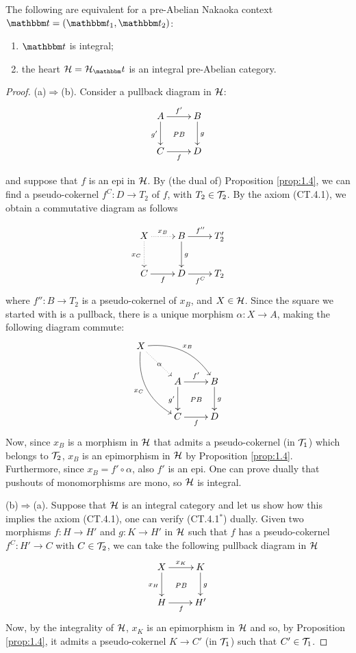 \begin{thm}\label{5:thm:integral}
The following are equivalent for a pre-Abelian Nakaoka context $\t=(\t_1,\t_2)$:
\begin{enumerate}[label=(\alph*)]
\item $\t$ is integral;
\item the heart $\clH=\clH_\t$ is an integral pre-Abelian category.
\end{enumerate}
\end{thm}
\begin{proof}
(a)$\Rightarrow$(b). Consider a pullback diagram in $\mathcal{H}$:
\[
\xymatrix{
A\ar@{}[dr]|{PB}\ar[r]^{f'}\ar[d]_{g'}&B\ar[d]^g\\
C\ar[r]_{f}&D
}
\]
\begin{sloppypar}
and suppose that $f$ is an epi in $\mathcal{H}$. By (the dual of) Proposition \ref{prop:1.4}, we can find a pseudo-cokernel $f^C\colon D\to T_2$ of $f$, with ${T_2\in \mathcal{T}_2}$. By the axiom (CT.4.1), we obtain a commutative diagram as follows
\end{sloppypar}
\[
\xymatrix{
X\ar@{.>}[d]_{x_C}\ar@{.>}[r]^{x_B}&B\ar[r]^{f''}\ar[d]^{g}&T'_2\\
C\ar[r]_f&D\ar[r]_{f^C}&T_2
}
\]
where $f''\colon B\to T_2$ is a pseudo-cokernel of $x_B$, and $X\in \mathcal{H}$. Since the square we started with is a pullback, there is a unique morphism $\alpha\colon X\to A$, making the following diagram commute:
\[
\xymatrix{
X\ar@/_15pt/[ddr]_{x_C}\ar@/_-15pt/[rrd]^{x_B}\ar@{.>}[dr]|\alpha\\
&A\ar@{}[dr]|{PB}\ar[r]^{f'}\ar[d]_{g'}&B\ar[d]^g\\
&C\ar[r]_{f}&D
}
\]
Now, since $x_B$ is a morphism in $\mathcal{H}$ that admits a pseudo-cokernel (in $\mathcal{T}_1$) which belongs to $\mathcal{T}_2$, $x_B$ is an epimorphism in $\mathcal{H}$ by Proposition \ref{prop:1.4}. Furthermore, since $x_B=f'\circ\alpha$, also $f'$ is an epi. One can prove dually that pushouts of monomorphisms are mono, so $\mathcal{H}$ is integral.

\smallskip\noindent
(b)$\Rightarrow$(a). Suppose that $\mathcal{H}$ is an integral category and let us show how this implies the axiom (CT.4.1), one can verify (CT.4.1$^*$) dually. Given two morphisms $f\colon H\to H'$ and $g\colon K\to H'$ in $\mathcal{H}$ such that $f$ has a pseudo-cokernel $f^C\colon H'\to C$ with $C\in \mathcal{T}_2$, we can take the following pullback diagram in $\mathcal{H}$
\[
\xymatrix{
X\ar[d]_{x_H}\ar[r]^{x_K}\ar@{}[dr]|{PB}&K\ar[d]^{g}\\
H\ar[r]_f&H'
}
\]
Now, by the integrality of $\mathcal{H}$, $x_K$ is an epimorphism in $\mathcal{H}$ and so, by Proposition \ref{prop:1.4}, it admits a pseudo-cokernel $K\to C'$ (in $\mathcal{T}_1$) such that $C'\in \mathcal{T}_1$.
\end{proof}

